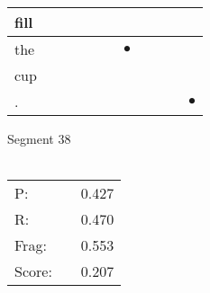 \documentclass[landscape]{article}
\newcommand{\ssp}{\hspace{2pt}}
\newcommand{\mex}{\cellcolor{g}$\bullet$}
\begin{document}
\begin{tabular}{|l|p{10pt}|p{10pt}|p{10pt}|p{10pt}|p{10pt}|p{10pt}|p{10pt}|p{10pt}|p{10pt}|p{10pt}|}
\hline
\ssp fill \ssp&\hspace{2pt}&\hspace{2pt}&\hspace{2pt}&\hspace{2pt}&\hspace{2pt}&\hspace{2pt}&\hspace{2pt}&\hspace{2pt}&\hspace{2pt}&\hspace{2pt}\\
\hline
\ssp \cellcolor{ref5}the \ssp&\hspace{2pt}&\hspace{2pt}&\hspace{2pt}&\hspace{2pt}&\hspace{2pt}&\hspace{2pt}\mex&\hspace{2pt}&\hspace{2pt}&\hspace{2pt}&\hspace{2pt}\\
\hline
\ssp cup \ssp&\hspace{2pt}&\hspace{2pt}&\hspace{2pt}&\hspace{2pt}&\hspace{2pt}&\hspace{2pt}&\hspace{2pt}&\hspace{2pt}&\hspace{2pt}&\hspace{2pt}\\
\hline
\ssp \cellcolor{ref9}. \ssp&\hspace{2pt}&\hspace{2pt}&\hspace{2pt}&\hspace{2pt}&\hspace{2pt}&\hspace{2pt}&\hspace{2pt}&\hspace{2pt}&\hspace{2pt}&\hspace{2pt}\mex\\
\hline
\end{tabular}

\vspace{6pt}
\noindent Segment 38\\\\
\noindent\begin{tabular}{lm{12pt}r}
\hline
P:&&0.427\\
R:&&0.470\\
Frag:&&0.553\\
Score:&&0.207\\
\end{tabular}
\end{document}
